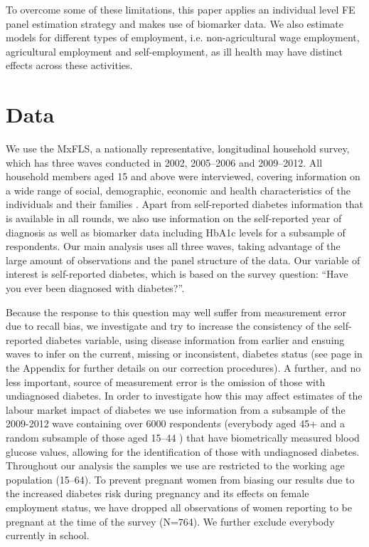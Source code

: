 To overcome some of these limitations, this paper applies an individual level \ac{FE} panel estimation strategy and makes use of biomarker data. We also estimate models for different types of employment, i.e. non-agricultural wage employment, agricultural employment and self-employment, as ill health may have distinct effects across these activities.
\section{\label{sec:Data}Data}

We use the \acf{MxFLS}, a nationally representative, longitudinal household survey, which has three waves conducted in 2002, 2005--2006 and 2009--2012. All household members aged 15 and above were interviewed, covering information on a wide range of social, demographic, economic and health characteristics of the individuals and their families \parencite{Rubalcava2013}. Apart from self-reported diabetes information that is available in all rounds, we also use information on the self-reported year of diagnosis as well as biomarker data including \ac{HbA1c} levels for a subsample of respondents.  Our main analysis uses all three waves, taking advantage of the large amount of observations and the panel structure of the data. Our variable of interest is self-reported diabetes, which is based on the survey question: ``Have you ever been diagnosed with diabetes?''. 

Because the response to this question may well suffer from measurement error due to recall bias, we investigate and try to increase the consistency of the self-reported diabetes variable, using disease information from earlier and ensuing waves to infer on the current, missing or inconsistent, diabetes status (see page \pageref{appendix_cha4_inconsist} in the Appendix for further details on our correction procedures). A further, and no less important, source of measurement error is the omission of those with undiagnosed diabetes. In order to investigate how this may affect estimates of the labour market impact of diabetes we use information from a subsample of the 2009-2012 wave containing over 6000 respondents (everybody aged 45+  and a random subsample of those aged 15--44 \parencite{Crimmins2015}) that have biometrically measured blood glucose values, allowing for the identification of those with undiagnosed diabetes. 
Throughout our analysis the samples we use are restricted to the working age population (15--64). To prevent pregnant women from biasing our results due to the increased diabetes risk during pregnancy and its effects on female employment status, we have dropped all observations of women reporting to be pregnant at the time of the survey (N=764). We further exclude everybody currently in school.

